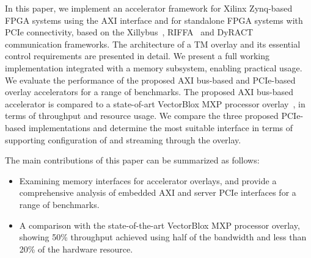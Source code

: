 In this paper, we implement an accelerator framework for  Xilinx Zynq-based FPGA systems using the AXI interface and for standalone FPGA systems with PCIe connectivity, based on the Xillybus~\cite{xillybus2018}, RIFFA~\cite{jacobsen2015riffa} and DyRACT~\cite{vipin2014dyract} communication frameworks. 
The architecture of a TM overlay and its essential control requirements are presented in detail. 
We present a full working implementation integrated with a memory subsystem, enabling practical usage. 
We evaluate the performance of the proposed AXI bus-based and PCIe-based overlay accelerators for a range of benchmarks. 
The proposed AXI bus-based accelerator is compared to a state-of-art VectorBlox MXP processor overlay~\cite{severance2013embedded}, in terms of throughput and resource usage. 
We compare the three proposed PCIe-based implementations and determine the most suitable interface in terms of supporting configuration of and streaming through the overlay. 


The main contributions of this paper can be summarized as follows:

\begin{itemize}
	\item	
	Examining memory interfaces for accelerator overlays, and provide a comprehensive analysis of embedded AXI and server PCIe interfaces for a range of benchmarks.
	
	\item
	A comparison with the state-of-the-art VectorBlox MXP processor overlay, showing 50\% throughput achieved using half of the bandwidth and less than 20\% of the hardware resource.
	
\end{itemize}
